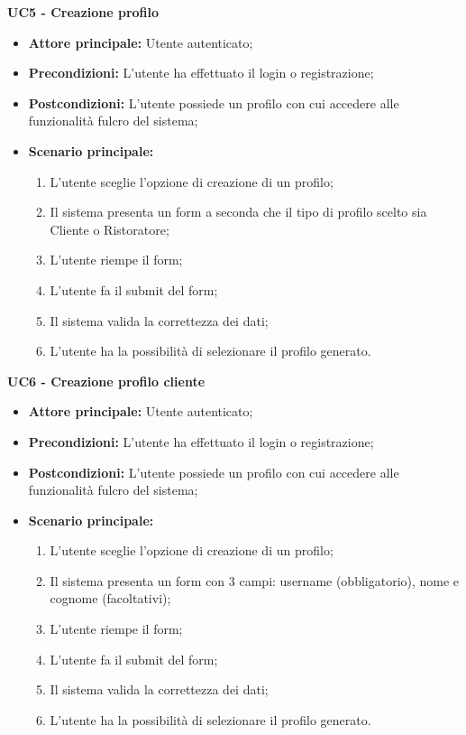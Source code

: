 \textbf{UC5 - Creazione profilo}
\begin{itemize}
    \item \textbf{Attore principale: }Utente autenticato;
    \item \textbf{Precondizioni: }L'utente ha effettuato il login o registrazione;
    \item \textbf{Postcondizioni: }L'utente possiede un profilo con cui accedere alle funzionalità fulcro del sistema;
    \item \textbf{Scenario principale:} 
        \begin{enumerate}
            \item L'utente sceglie l'opzione di creazione di un profilo;
            \item Il sistema presenta un form a seconda che il tipo di profilo scelto sia Cliente o Ristoratore;
            \item L'utente riempe il form;
            \item L'utente fa il submit del form;
            \item Il sistema valida la correttezza dei dati;
            \item L'utente ha la possibilità di selezionare il profilo generato.
        \end{enumerate}
\end{itemize}

\textbf{UC6 - Creazione profilo cliente}
\begin{itemize}
    \item \textbf{Attore principale: }Utente autenticato;
    \item \textbf{Precondizioni: }L'utente ha effettuato il login o registrazione;
    \item \textbf{Postcondizioni: }L'utente possiede un profilo con cui accedere alle funzionalità fulcro del sistema;
    \item \textbf{Scenario principale:} 
        \begin{enumerate}
            \item L'utente sceglie l'opzione di creazione di un profilo;
            \item Il sistema presenta un form con 3 campi: username (obbligatorio), nome e cognome (facoltativi);
            \item L'utente riempe il form;
            \item L'utente fa il submit del form;
            \item Il sistema valida la correttezza dei dati;
            \item L'utente ha la possibilità di selezionare il profilo generato.
        \end{enumerate}
\end{itemize}
